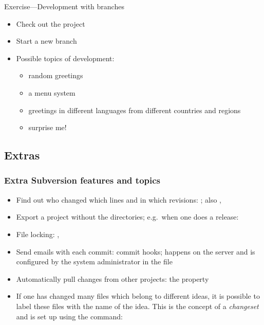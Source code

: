 \begin{frame}{Exercise---Development with branches}
    \begin{itemize}
        \item Check out the  project
        \item Start a new branch
        \item Possible topics of development:
        \begin{itemize}
            \item random greetings
            \item a menu system
            \item greetings in different languages from different countries
                and regions
            \item surprise me!
        \end{itemize}
    \end{itemize}
\end{frame}

\subsection{Extras}
\begin{frame}[fragile]
    \frametitle{Extra Subversion features and topics}
    \linuxframe

    \begin{itemize}
        \item Find out who changed which lines and in which revisions:
            ; also , 
        \item Export a project without the  directories;
            e.g.~when one does a release: 
        \item File locking: , 
        \item Send emails with each commit: commit hooks; happens on the
            server and is configured by the system administrator in the
             file
        \item Automatically pull changes from other projects:
            the  property 
        \item If one has changed many files which belong to different ideas,
            it is possible to label these files with the name of the idea.
            This is the concept of a \emph{changeset} and is set up using
            the  command:
        \end{itemize}

\end{frame}

